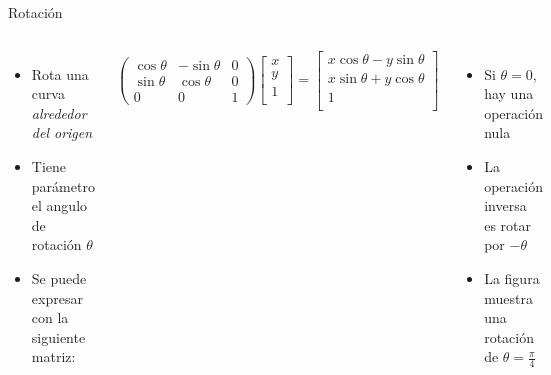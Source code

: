 \begin{frame}{Rotación}
\begin{columns}
\begin{itemize}
    \item Rota una curva \emph{alrededor del origen}
    \item Tiene parámetro el angulo de rotación $\theta$
    \item Se puede expresar con la siguiente matriz:
\end{itemize}
$$
\begin{pmatrix}
\cos \theta & -\sin \theta & 0 \\
\sin \theta & \cos \theta & 0 \\
0 & 0 & 1
\end{pmatrix}
\begin{bmatrix}
x \\
y \\
1 \\
\end{bmatrix}
=
\begin{bmatrix}
x \cos \theta - y \sin \theta \\
x \sin \theta + y \cos \theta  \\
1 \\
\end{bmatrix}
$$
\begin{itemize}
    \item Si $\theta = 0$, hay una operación nula
    \item La operación inversa es rotar por $-\theta$
    \item La figura muestra una rotación de $\theta = \frac{\pi}{4}$
\end{itemize}
\begin{figure}[htp]
 \centering
 \begin{subfigure}[b]{0.4\textwidth}
   \includegraphics[width=\textwidth]{img/Square}

\end{subfigure}
\end{figure}
\end{columns}
\end{frame}
